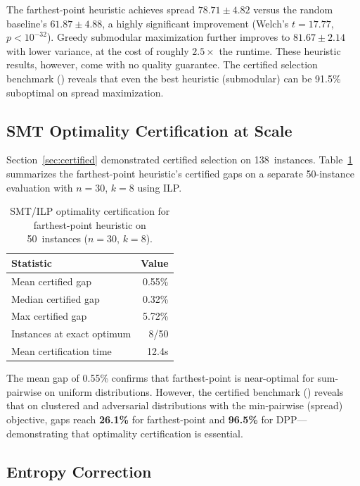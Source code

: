 \documentclass[11pt,a4paper]{article}
\begin{document}
The farthest-point heuristic achieves spread
$78.71 \pm 4.82$ versus the random baseline's
$61.87 \pm 4.88$, a highly significant improvement
(Welch's $t = 17.77$, $p < 10^{-32}$).
Greedy submodular maximization further improves to
$81.67 \pm 2.14$ with lower variance, at the cost
of roughly $2.5\times$ the runtime.
These heuristic results, however, come with no
quality guarantee.  The certified selection benchmark
() reveals that even the best
heuristic (submodular) can be 91.5\% suboptimal on
spread maximization.

\subsection{SMT Optimality Certification at Scale}\label{sec:exp_smt}

Section~\ref{sec:certified} demonstrated certified selection on
138~instances.  Table~\ref{tab:smt} summarizes the farthest-point
heuristic's certified gaps on a separate 50-instance evaluation
with $n = 30$, $k = 8$ using ILP.

\begin{table}[t]
\centering
\caption{SMT/ILP optimality certification for farthest-point
heuristic on 50~instances ($n = 30$, $k = 8$).}
\label{tab:smt}
\begin{tabular}{@{}lr@{}}
\toprule
Statistic & Value \\
\midrule
Mean certified gap & 0.55\% \\
Median certified gap & 0.32\% \\
Max certified gap & 5.72\% \\
Instances at exact optimum & 8/50 \\
Mean certification time & 12.4s \\
\bottomrule
\end{tabular}
\end{table}

The mean gap of 0.55\% confirms that farthest-point is
near-optimal for sum-pairwise on uniform distributions.
However, the certified benchmark () reveals
that on clustered and adversarial distributions with the
min-pairwise (spread) objective, gaps reach \textbf{26.1\%} for
farthest-point and \textbf{96.5\%} for DPP---demonstrating that
optimality certification is essential.

\subsection{Entropy Correction}\label{sec:exp_entropy}
\end{document}
